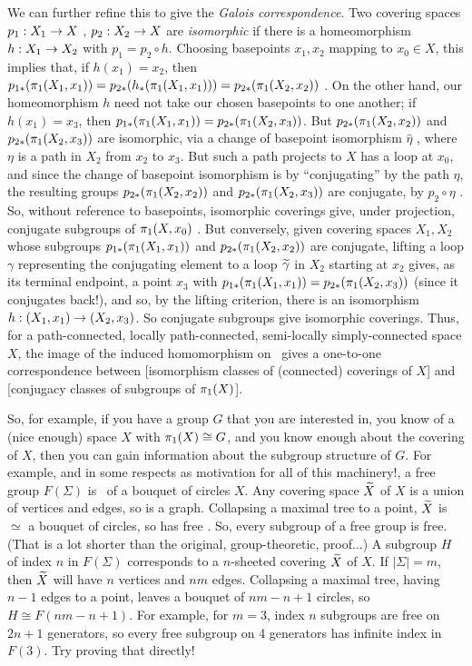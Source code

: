 We can further refine this to give the {\it Galois correspondence}. Two covering spaces
$p_1:X_1\rightarrow X$ , $p_2:X_2\rightarrow X$ are {\it isomorphic} if there is a homeomorphism
$h:X_1\rightarrow X_2$ with $p_1=p_2\circ h$. Choosing basepoints $x_1,x_2$ mapping to $x_0\in X$,
this implies that, if $h(x_1)=x_2$, then $p_{1*}(\pi_1(X_1,x_1)) = p_{2*}(h_*(\pi_1(X_1,x_1))) = 
p_{2*}(\pi_1(X_2,x_2))$ . On the other hand, our homeomorphism $h$ need not take our
chosen basepoints to one another; if $h(x_1)=x_3$, then $p_{1*}(\pi_1(X_1,x_1)) = p_{2*}(\pi_1(X_2,x_3))$.
But  $p_{2*}(\pi_1(X_2,x_2))$ and $p_{2*}(\pi_1(X_2,x_3))$ are isomorphic, via a change 
of basepoint isomorphism $\widehat{\eta}$ , where $\eta$ is a path in $X_2$ from $x_2$ to $x_3$.
But such a path projects to $X$ has a loop at $x_0$, and since the change of basepoint isomorphism
is by ``conjugating'' by the path $\eta$, the resulting groups $p_{2*}(\pi_1(X_2,x_2))$ and $p_{2*}(\pi_1(X_2,x_3))$
are conjugate, by $p_2\circ \eta$ . So, without reference to basepoints, isomorphic coverings give,
under projection, conjugate subgroups of $\pi_1(X,x_0)$ . But conversely, given covering spaces
$X_1,X_2$ whose subgroups $p_{1*}(\pi_1(X_1,x_1))$ and $p_{2*}(\pi_1(X_2,x_2))$ are conjugate,
lifting a loop $\gamma$ representing the conjugating element to a loop $\widetilde{\gamma}$ in
$X_2$ starting at $x_2$ gives, as its terminal endpoint, a point $x_3$ with 
$p_{1*}(\pi_1(X_1,x_1)) = p_{2*}(\pi_1(X_2,x_3))$ (since it conjugates back!), and so, by the lifting criterion,
there is an isomorphism $h:(X_1,x_1) \rightarrow (X_2,x_3)$. So conjugate subgroups give isomorphic coverings.
Thus, for a path-connected, locally path-connected, semi-locally simply-connected space $X$,  
the image of the induced homomorphism on \mpu\ 
gives a one-to-one correspondence between 
[isomorphism classes of (connected) coverings of $X$] and 
[conjugacy classes of subgroups of $\pi_1(X)$].

\msk

So, for example, if you have a group $G$ that you are interested in, you know of a (nice enough) 
space $X$ with $\pi_1(X)\cong G$, and you know enough about the covering of $X$, then you can
gain information about the subgroup structure of $G$. For example, and in some respects as
motivation for all of this machinery!, a free group $F(\Sigma)$ is \mpu\ of a bouquet of circles $X$. 
Any covering space $\widetilde{X}$ of $X$ is a union of vertices and edges, so is a graph.  Collapsing
a maximal tree to a point, $\widetilde{X}$ is $\simeq$ a bouquet of circles, so has free \mpu . So, every
subgroup of a free group is free. (That is a lot shorter than the original, group-theoretic, proof...) 
A subgroup $H$ of index $n$ in $F(\Sigma)$ corresponds to a $n$-sheeted covering $\widetilde{X}$ of $X$. If
$|\Sigma| = m$, then $\widetilde{X}$ will have $n$ vertices and $nm$ edges. Collapsing a maximal
tree, having $n-1$ edges to a point, leaves a bouquet of $nm-n+1$ circles, so $H\cong F(nm-n+1)$.
For example, for $m=3$, index $n$ subgroups are free on $2n+1$ generators, so every free subgroup
on 4 generators has infinite index in $F(3)$. Try proving that directly!

